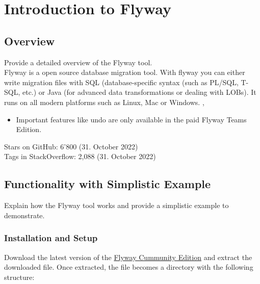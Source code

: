 

\chapter{Introduction to Flyway}

\section{Overview}
%
Provide a detailed overview of the Flyway tool.\\


Flyway is a open source database migration tool. With flyway you can either write migration files with
SQL (database-specific syntax (such as PL/SQL, T-SQL, etc.) or Java (for advanced data transformations
or dealing with LOBs). It runs on all modern platforms such as Linux, Mac or Windows.
\cite{Dillon2022}, \cite{DBMSTools}



%

%

%

%
\begin{itemize}
	\item Important features like undo are only available in the paid Flyway Teams Edition.
\end{itemize}


%
Stars on GitHub: 6'800 (31. October 2022)\\
Tags in StackOverflow: 2,088 (31. October 2022)\\

\newpage
\section{Functionality with Simplistic Example}
Explain how the Flyway tool works and provide a simplistic example to demonstrate.

\subsection{Installation and Setup}
Download the latest version of the \href{https://flywaydb.org/download/community}{Flyway Cummunity Edition} and extract the downloaded file. 
Once extracted, the file becomes a directory with the following structure:


